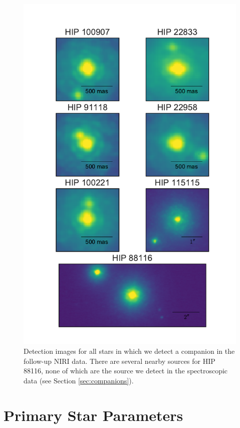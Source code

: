 \documentclass{emulateapj}
\begin{document}
\begin{figure}
\includegraphics[width=\columnwidth]{Imaging_Data.pdf}
\caption{Detection images for all stars in which we detect a companion in the follow-up NIRI data. 
There are several nearby sources for HIP 88116, none of which are the source we detect in the 
spectroscopic data (see Section \ref{sec:companions}).}
\label{fig:images}
\end{figure}





\section{Primary Star Parameters}
\label{sec:sp}
\end{document}
